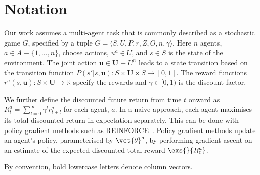 \section{Notation}
\label{sec:background}


Our work assumes a multi-agent task that is commonly described as a stochastic game $G$, specified by a tuple $G = {\langle}S, U, P, r, Z, O, n, \gamma{\rangle}$. Here $n$ agents, $a \in A \equiv \{1,...,n\}$, choose actions, $u^a \in U$, and $s \in S$ is the state of the environment. The joint action $\mathbf{u} \in \mathbf{U} \equiv U^{n}$ leads to a state transition based on the transition function $P(s'|s,\mathbf{u}): S \times \mathbf{U} \times S \rightarrow [0,1]$. The reward functions $r^a(s,\mathbf{u}): S \times \mathbf{U} \rightarrow \mathbb{R}$ specify the rewards and $\gamma \in [0,1)$ is the discount factor.

We further define the discounted future return from time $t$ onward as $R^a_t = \sum_{l=0}^\infty \gamma^l r^a_{t+l}$ for each agent, $a$. In a naive approach, each agent maximises its total discounted return in expectation separately. This can be done with policy gradient methods \citep{sutton1999policy} such as REINFORCE~\citep{williams1992simple}. Policy gradient methods update an agent's policy, parameterised by $\vct{\theta}^a$, by performing gradient ascent on an estimate of the expected discounted total reward $\exs{}{R^a_0}$. 

By convention, bold lowercase letters denote column vectors.



